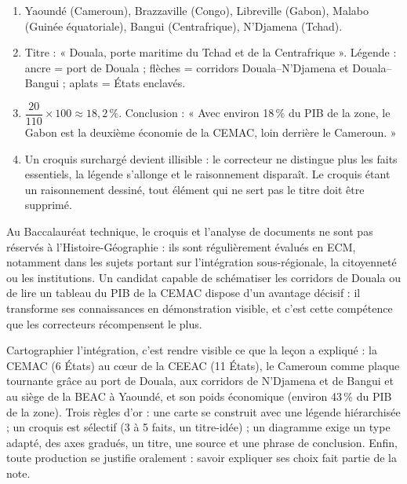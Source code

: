 \documentclass[11pt]{article}
\begin{document}
\begin{corrige}[Exercice]
\begin{enumerate}
\item Yaoundé (Cameroun), Brazzaville (Congo), Libreville (Gabon), Malabo (Guinée équatoriale), Bangui (Centrafrique), N'Djamena (Tchad).
\item Titre : « Douala, porte maritime du Tchad et de la Centrafrique ». Légende : ancre = port de Douala ; flèches = corridors Douala--N'Djamena et Douala--Bangui ; aplats = États enclavés.
\item $\dfrac{20}{110} \times 100 \approx 18,2\,\%$. Conclusion : « Avec environ 18\,\% du PIB de la zone, le Gabon est la deuxième économie de la CEMAC, loin derrière le Cameroun. »
\item Un croquis surchargé devient illisible : le correcteur ne distingue plus les faits essentiels, la légende s'allonge et le raisonnement disparaît. Le croquis étant un raisonnement dessiné, tout élément qui ne sert pas le titre doit être supprimé.
\end{enumerate}
\end{corrige}

\begin{savaistu}
Au Baccalauréat technique, le croquis et l'analyse de documents ne sont pas réservés à l'Histoire-Géographie : ils sont régulièrement évalués en ECM, notamment dans les sujets portant sur l'intégration sous-régionale, la citoyenneté ou les institutions. Un candidat capable de schématiser les corridors de Douala ou de lire un tableau du PIB de la CEMAC dispose d'un avantage décisif : il transforme ses connaissances en démonstration visible, et c'est cette compétence que les correcteurs récompensent le plus.
\end{savaistu}

\begin{aretenir}[L'essentiel du TP]
Cartographier l'intégration, c'est rendre visible ce que la leçon a expliqué : la CEMAC (6 États) au cœur de la CEEAC (11 États), le Cameroun comme plaque tournante grâce au port de Douala, aux corridors de N'Djamena et de Bangui et au siège de la BEAC à Yaoundé, et son poids économique (environ 43\,\% du PIB de la zone). Trois règles d'or : une carte se construit avec une légende hiérarchisée ; un croquis est sélectif (3 à 5 faits, un titre-idée) ; un diagramme exige un type adapté, des axes gradués, un titre, une source et une phrase de conclusion. Enfin, toute production se justifie oralement : savoir expliquer ses choix fait partie de la note.
\end{aretenir}
\end{document}
